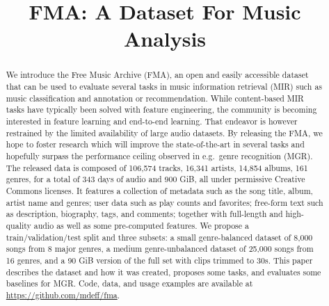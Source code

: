 \documentclass{article}
\title{FMA: A Dataset For Music Analysis}
\newcommand{\ntracks}{106,574 }
\newcommand{\nartists}{16,341 }
\newcommand{\nalbums}{14,854 }
\newcommand{\ngenres}{161 }
\newcommand{\tduration}{343 }
\newcommand{\size}{900 }
\begin{document}
\maketitle

\begin{abstract}
We introduce the Free Music Archive (FMA), an open and easily accessible dataset that can be used to evaluate several tasks in music information retrieval (MIR) such as music classification and annotation or recommendation.
While content-based MIR tasks have typically been solved with feature engineering,
the community is becoming interested in feature learning and end-to-end learning. %
That endeavor is however restrained by the limited availability of large audio datasets.
By releasing the FMA, we hope to foster research which will improve the state-of-the-art in several tasks and hopefully surpass the performance ceiling observed in e.g.\ genre recognition (MGR).
The released data is composed of \ntracks tracks, \nartists artists, \nalbums albums, \ngenres genres, for a total of \tduration days of audio and \size GiB, all under permissive Creative Commons licenses.
It features a collection of metadata such as the song title, album, artist name and genres; user data such as play counts and favorites; free-form text such as description, biography, tags, and comments; together with full-length and high-quality audio as well as some pre-computed features. We propose a train/validation/test split and three subsets: a small genre-balanced dataset of 8,000 songs from 8 major genres, a medium genre-unbalanced dataset of 25,000 songs from 16 genres, and a 90 GiB version of the full set with clips trimmed to 30s.
This paper describes the dataset and how it was created, proposes some tasks, and evaluates some baselines for MGR.
Code, data, and usage examples are available at \url{https://github.com/mdeff/fma}.


\end{abstract}
\end{document}
